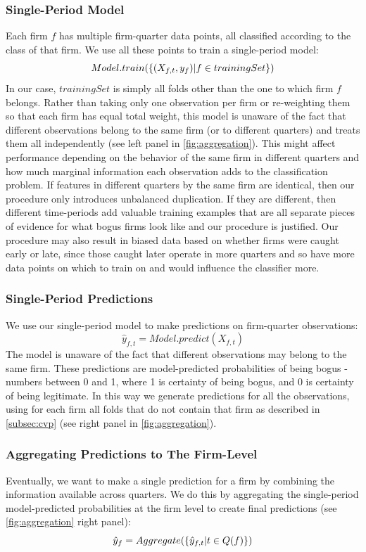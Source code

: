 \subsubsection{Single-Period Model}
\label{subsubsec:single-period-model}
Each firm  $f$ has multiple firm-quarter data points, all classified according to the class of that firm. We use all these points to train a single-period model: \[Model.train(\{(X_{f,t},y_f) \space | \space f \in trainingSet\})\] In our case, $trainingSet$ is simply all folds other than the one to which firm $f$ belongs. Rather than taking only one observation per firm or re-weighting them so that each firm has equal total weight, this model is unaware of the fact that different observations belong to the same firm (or to different quarters) and treats them all independently (see left panel in \cref{fig:aggregation}).  This might affect performance depending on the behavior of the same firm in different quarters and how much marginal information each observation adds to the classification problem. If features in different quarters by the same firm are identical, then our procedure only introduces unbalanced duplication. If they are different, then different time-periods add valuable training examples that are all separate pieces of evidence for what bogus firms look like and our procedure is justified. Our procedure may also result in biased data based on whether firms were caught early or late, since those caught later operate in more quarters and so have more data points on which to train on and would influence the classifier more.

\subsubsection{Single-Period Predictions}
\label{subsubsec:single-period-prediction}
We use our single-period model to make predictions on firm-quarter observations: \[\hat{y}_{f,t}=Model.predict(X_{f,t})\] The model is unaware of the fact that different observations may belong to the same firm. These predictions are model-predicted probabilities of being bogus - numbers between 0 and 1, where 1 is certainty of being bogus, and 0 is certainty of being legitimate. In this way we generate predictions for all the observations, using for each firm all folds that do not contain that firm as described in \cref{subsec:cvp} (see right panel in \cref{fig:aggregation}).

\subsubsection{Aggregating Predictions to The Firm-Level}
\label{subsubsec:predictionaggregation}
Eventually, we want to make a single prediction for a firm by combining the information available across quarters. We do this by aggregating the single-period model-predicted probabilities at the firm level to create final predictions (see \cref{fig:aggregation} right panel): \[\hat{y}_f=Aggregate(\{\hat{y}_{f,t}\space|t \in Q(f)\})\]

